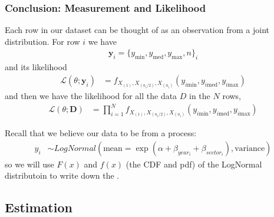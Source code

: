 \documentclass[usenames,dvipsnames]{beamer}
\begin{document}
\begin{frame}[t]
  \tableofcontents[currentsubsection]
\end{frame}



\begin{frame}
\frametitle{Conclusion: Measurement and Likelihood}
Each row in our dataset can be thought of as an observation from a joint distribution.
For row $i$ we have
\begin{align*}
\boldsymbol{y}_i = \{y_{\text{min}}, y_{\text{med}}, y_{\text{max}}, n \}_i
\end{align*}
and its likelihood
\begin{align*}
{\mathcal {L}}(\theta ;\boldsymbol{y}_i)
&=
f_{X_{(1)} , X_{(n_i/2)}, X_{(n_i)}  }(y_{i\text{min}}, y_{i\text{med}}, y_{i\text{max}})
\end{align*}
and then we have the likelihood for all the data $D$ in the $N$ rows,
\begin{align*}
{\mathcal {L}}(\theta ; \boldsymbol{D})
&=
\prod_{i=1}^{N}{
f_{X_{(1)} , X_{(n_i/2)}, X_{(n_i)}  }(y_{i\text{min}}, y_{i\text{med}}, y_{i\text{max}})
}
\end{align*}


Recall that we believe our data to be from a process:
\begin{align*}
 y_i &\sim LogNormal( \text{mean} = \exp{( \alpha + \beta_{year_i} +  \beta_{sector_i})} , \text{variance} )
\end{align*}
so we will use $F(x)$ and $f(x)$ (the CDF and pdf) of the LogNormal distributoin to write down the .

\end{frame}


\subsection{Estimation}

\begin{frame}[t]
  \tableofcontents[currentsubsection]
\end{frame}
\end{document}
